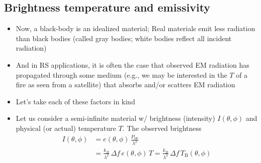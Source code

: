 \documentclass[11pt, oneside]{article}
\begin{document}
\subsection{Brightness temperature and emissivity}
\label{s:tb}

\begin{itemize}
	\item Now, a black-body is an idealized material; Real materials emit less radiation than black bodies (called gray bodies; white bodies reflect all incident radiation)
	\item And in RS applications, it is often the case that observed EM radiation has propagated through some medium (e.g., we may be interested in the $T$ of a fire as seen from a satellite) that absorbs and/or scatters EM radiation
	\item Let's take each of these factors in kind
	\item Let us consider a semi-infinite material w/ brightness (intensity) $I(\theta,\phi)$ and physical (or actual) temperature $T$. The observed brightness
	\begin{align}
		I(\theta,\phi) &= e(\theta,\phi)\,\frac{P_\mathrm{bb}}{\lambda^2} \nonumber\\
		&= \frac{k_B}{\lambda^2}\,\Delta f\,e(\theta,\phi)\,T = \frac{k_B}{\lambda^2}\,\Delta f\,T_\mathrm{B}(\theta,\phi) \label{e:I}

\end{align}
\end{itemize}
\end{document}
